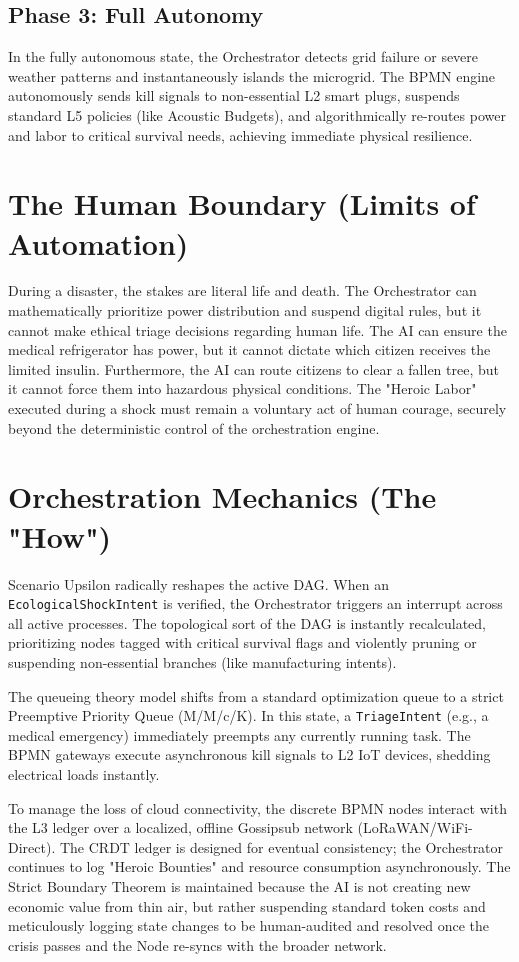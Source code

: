 \subsection{Phase 3: Full Autonomy}
In the fully autonomous state, the Orchestrator detects grid failure or severe weather patterns and instantaneously islands the microgrid. The BPMN engine autonomously sends kill signals to non-essential L2 smart plugs, suspends standard L5 policies (like Acoustic Budgets), and algorithmically re-routes power and labor to critical survival needs, achieving immediate physical resilience.

\section{The Human Boundary (Limits of Automation)}
During a disaster, the stakes are literal life and death. The Orchestrator can mathematically prioritize power distribution and suspend digital rules, but it cannot make ethical triage decisions regarding human life. The AI can ensure the medical refrigerator has power, but it cannot dictate which citizen receives the limited insulin. Furthermore, the AI can route citizens to clear a fallen tree, but it cannot force them into hazardous physical conditions. The "Heroic Labor" executed during a shock must remain a voluntary act of human courage, securely beyond the deterministic control of the orchestration engine.

\section{Orchestration Mechanics (The "How")}
Scenario Upsilon radically reshapes the active DAG. When an \texttt{EcologicalShockIntent} is verified, the Orchestrator triggers an interrupt across all active processes. The topological sort of the DAG is instantly recalculated, prioritizing nodes tagged with critical survival flags and violently pruning or suspending non-essential branches (like manufacturing intents).

The queueing theory model shifts from a standard optimization queue to a strict Preemptive Priority Queue (M/M/c/K). In this state, a \texttt{TriageIntent} (e.g., a medical emergency) immediately preempts any currently running task. The BPMN gateways execute asynchronous kill signals to L2 IoT devices, shedding electrical loads instantly.

To manage the loss of cloud connectivity, the discrete BPMN nodes interact with the L3 ledger over a localized, offline Gossipsub network (LoRaWAN/WiFi-Direct). The CRDT ledger is designed for eventual consistency; the Orchestrator continues to log "Heroic Bounties" and resource consumption asynchronously. The Strict Boundary Theorem is maintained because the AI is not creating new economic value from thin air, but rather suspending standard token costs and meticulously logging state changes to be human-audited and resolved once the crisis passes and the Node re-syncs with the broader network.
